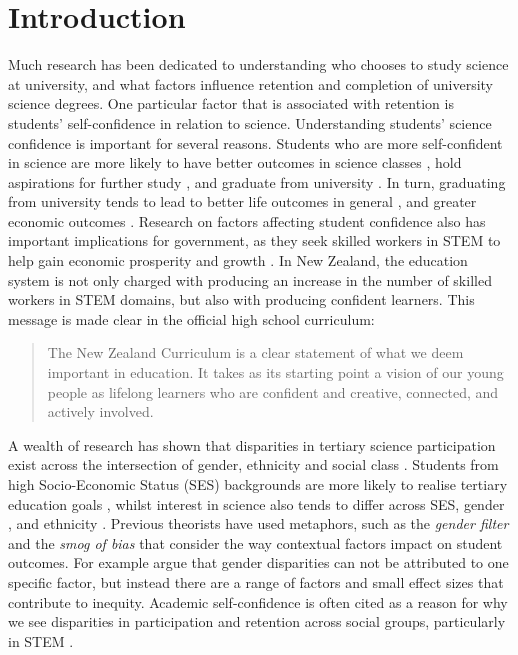 \section*{Introduction}
\label{intro}
Much research has been dedicated to understanding who chooses to study science at university, and what factors influence retention and completion of university science degrees. One particular factor that is associated with retention is students' self-confidence in relation to science. Understanding students' science confidence is important for several reasons. Students who are more self-confident in science are more likely to have better outcomes in science classes \cite{uccar2017role,tighezza2014modeling,chang2008science,peters2013examining}, hold aspirations for further study \cite{mujtaba2018students}, and graduate from university \cite{larson2015predicting}. In turn, graduating from university tends to lead to better life outcomes in general \cite{Oreopoulos_2007}, and greater economic outcomes \cite{norton2016mapping,mahoney2013moving}. Research on factors affecting student confidence also has important implications for government, as they seek skilled workers in STEM to help gain economic prosperity and growth \cite{pricewaterhousecoopers2015smart}. In New Zealand, the education system is not only charged with producing an increase in the number of skilled workers in STEM domains, but also with producing confident learners. This message is made clear in the official high school curriculum:

\begin{quote}
   The New Zealand Curriculum is a clear statement of what we deem important in education. It takes as its starting point a vision of our young people as lifelong learners who are confident and creative, connected, and actively involved.
\end{quote} \cite{NZC}

A wealth of research has shown that disparities in tertiary science participation exist across the intersection of gender, ethnicity and social class \cite{reynolds2011change,meehan2017explaining}. Students from high Socio-Economic Status (SES) backgrounds are more likely to realise tertiary education goals \cite{reynolds2011change}, whilst interest in science also tends to differ across SES, gender \cite{cheryan2017some}, and ethnicity \cite{Wong2016ScienceStudents}. Previous theorists have used metaphors, such as the \textit{gender filter} \cite{Blickenstaff_2005} and the \textit{smog of bias} \cite{Kost_Smith_2010} that consider the way contextual factors impact on student outcomes. For example \cite{Kost_Smith_2010} argue that gender disparities can not be attributed to one specific factor, but instead there are a range of factors and small effect sizes that contribute to inequity. Academic self-confidence is often cited as a reason for why we see disparities in participation and retention across social groups, particularly in STEM \cite{Blickenstaff_2005}.  

